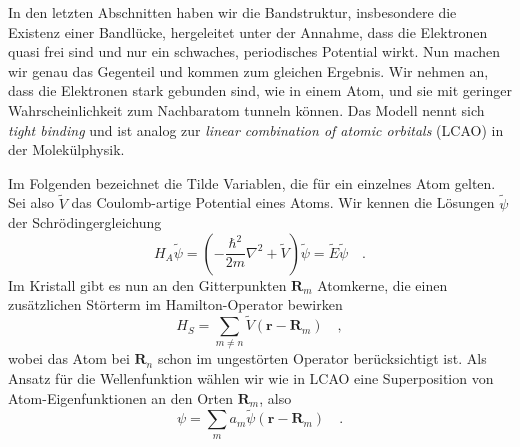 In den letzten Abschnitten haben wir die Bandstruktur, insbesondere die Existenz einer Bandlücke, hergeleitet unter der Annahme, dass die Elektronen quasi frei sind und nur ein schwaches, periodisches Potential wirkt. Nun machen wir genau das Gegenteil und kommen zum gleichen Ergebnis. Wir nehmen an, dass die Elektronen stark gebunden sind, wie in einem Atom, und sie mit geringer Wahrscheinlichkeit zum Nachbaratom tunneln können. Das Modell nennt sich \emph{tight binding} und ist analog zur \emph{linear combination of atomic orbitals} (LCAO) in der Molekülphysik.

Im Folgenden bezeichnet die Tilde Variablen, die für ein einzelnes Atom gelten. Sei also $\tilde{V}$ das Coulomb-artige Potential eines Atoms. Wir kennen die Lösungen $\tilde{\psi}$ der Schrödingergleichung
\begin{equation}
    H_A \tilde{\psi}  = \left( - \frac{\hbar^2}{2m} \nabla^2 + \tilde{V} \right) \tilde{\psi} = \tilde{E} \tilde{\psi} \quad .
\end{equation}
Im Kristall gibt es nun an den Gitterpunkten $\mathbf{R}_m$ Atomkerne, die einen zusätzlichen Störterm im Hamilton-Operator bewirken
\begin{equation}
    H_S = \sum_{m \neq n} \tilde{V}(\mathbf{r} - \mathbf{R}_m) \quad ,
\end{equation}
wobei das Atom bei $\mathbf{R}_n$ schon im ungestörten Operator berücksichtigt ist. Als Ansatz für die Wellenfunktion wählen wir wie in LCAO eine Superposition von Atom-Eigenfunktionen an den Orten $\mathbf{R}_m$, also
\begin{equation}
    \psi = \sum_m a_m \tilde{\psi} (\mathbf{r} - \mathbf{R}_m) \quad .
\end{equation}

